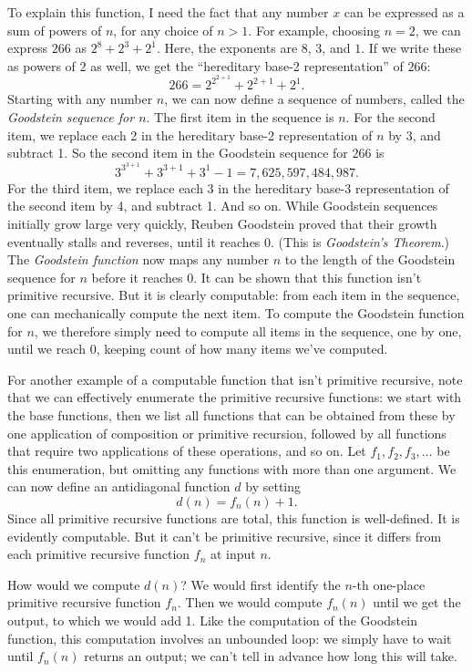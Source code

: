 To explain this function,
I need the fact that
any number $x$ can be expressed as a sum of powers of $n$,
for any choice of $n>1$.
For example,
choosing $n=2$,
we can express $266$ as $2^8 + 2^3 + 2^1$.
Here,
the exponents are $8$, $3$, and $1$.
If we write these as powers of $2$ as well,
we get the ``hereditary base-2 representation'' of $266$:
\[
  266 = 2^{2^{2+1}} + 2^{2+1} + 2^1.
\]
Starting with any number $n$,
we can now define a sequence of numbers,
called the \emph{Goodstein sequence for $n$}.
The first item in the sequence is $n$.
For the second item,
we replace each 2 in the hereditary base-2 representation of $n$ by 3, and subtract 1.
So the second item in the Goodstein sequence for $266$ is
\[
  3^{3^{3+1}} + 3^{3+1} + 3^1 - 1 = 7,625,597,484,987.
\]
For the third item, we replace each 3 in the hereditary base-3 representation of the second item by 4, and subtract 1.
And so on.
While Goodstein sequences initially grow large very quickly,
Reuben Goodstein proved that
their growth eventually stalls and reverses,
until it reaches 0.
(This is \textit{Goodstein's Theorem}.)
The \textit{Goodstein function} now maps any number $n$ to the length of the
Goodstein sequence for $n$ before it reaches 0.
It can be shown that this function isn't primitive recursive.
But it is clearly computable:
from each item in the sequence,
one can mechanically compute the next item.
To compute the Goodstein function for $n$,
we therefore simply need to compute all items in the sequence,
one by one,
until we reach 0,
keeping count of how many items we've computed.

For another example of a computable function that isn't primitive recursive,
note that we can effectively enumerate the primitive recursive functions:
we start with the base functions,
then we list all functions that can be obtained from these by one application of composition or primitive recursion,
followed by all functions that require two applications of these operations,
and so on.
Let $f_1, f_2, f_3, \ldots$ be this enumeration,
but omitting any functions with more than one argument.
We can now define an antidiagonal function $d$ by setting
\[
  d(n) = f_n(n) + 1.
\]
Since all primitive recursive functions are total,
this function is well-defined.
It is evidently computable.
But it can't be primitive recursive,
since it differs from each primitive recursive function $f_n$ at input $n$.

How would we compute $d(n)$?
We would first identify the $n$-th one-place primitive recursive function $f_n$.
Then we would compute $f_n(n)$ until we get the output,
to which we would add 1.
Like the computation of the Goodstein function,
this computation involves an unbounded loop:
we simply have to wait until $f_n(n)$ returns an output;
we can't tell in advance how long this will take.

